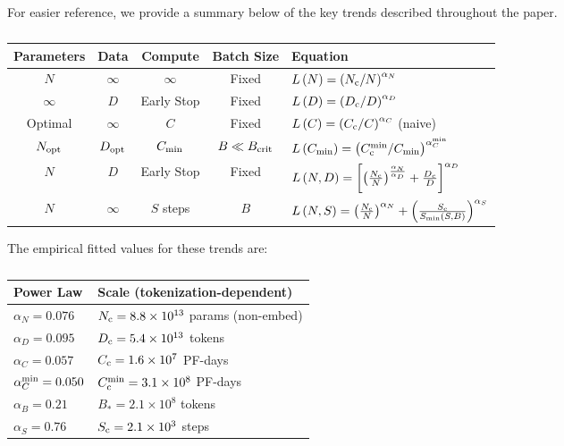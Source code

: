 \documentclass[english]{article}
\begin{document}
For easier reference, we provide a summary below of the key trends described throughout the paper.

\begin{table}[h!]
\centering
\vspace{-0.5em}
\begin{tabular}{|c|c|c|c|l|}
\hline 
\textbf{Parameters}  & \textbf{Data}  & \textbf{Compute}  & \textbf{Batch Size}  & \textbf{Equation}\tabularnewline
\hline 
\hline 
$N$  & $\infty$  & \multicolumn{1}{c|}{$\infty$ } & Fixed  & $L\left(N\right)=\left(N_{{\rm c}}/N\right)^{\alpha_{N}}$\tabularnewline
\hline 
$\infty$  & $D$  & \multicolumn{1}{c|}{Early Stop } & Fixed  & $L\left(D\right)=\left(D_{{\rm c}}/D\right)^{\alpha_{D}}$\tabularnewline
\hline 
Optimal  & $\infty$  & $C$  & Fixed  & $L\left(C\right)=\left(C_{{\rm c}}/C\right)^{\alpha_{C}}$ (naive)\tabularnewline
\hline 
$N_{{\rm opt}}$ & $D_{{\rm opt}}$ & $C_{{\rm min}}$  & $B\ll B_{{\rm crit}}$  & $L\left(C_{{\rm min}}\right)=\left(C_{{\rm c}}^{{\rm min}}/C_{{\rm min}}\right)^{\alpha_{C}^{{\rm min}}}$\tabularnewline
\hline 
$N$  & $D$  & \multicolumn{1}{c|}{Early Stop } & Fixed  & $L\left(N,D\right)=\left[\left(\frac{N_{{\rm c}}}{N}\right)^{\frac{\alpha_{N}}{\alpha_{D}}}+\frac{D_{c}}{D}\right]^{\alpha_{D}}$\tabularnewline
\hline 
$N$  & $\infty$  & $S$ steps & $B$  & $L\left(N,S\right)=\left(\frac{N_{{\rm c}}}{N}\right)^{\alpha_{N}}+\left(\frac{S_{{\rm c}}}{S_{{\rm min}}\left(S,B\right)}\right)^{\alpha_{S}}$\tabularnewline
\hline 
\end{tabular}
\vspace{0.5em}
\caption[Key trend equations]{}
\vspace{-1em}
\end{table}

The empirical fitted values for these trends are:


\begin{table}[h!]
\centering
\vspace{-0.5em}
\begin{tabular}{|l|l|}
\hline 
\textbf{Power Law}  & \textbf{Scale (tokenization-dependent)}\tabularnewline
\hline 
\hline 
$\alpha_{N}=0.076$  & $N_{{\rm c}}=8.8\times10^{13}$ params (non-embed)\tabularnewline
\hline 
$\alpha_{D}=0.095$  & $D_{{\rm c}}=5.4\times10^{13}$ tokens\tabularnewline
\hline 
$\alpha_{C}=0.057$  & $C_{{\rm c}}=1.6\times10^{7}$ PF-days\tabularnewline
\hline 
$\alpha_{C}^{{\rm min}}=0.050$  & $C_{{\rm c}}^{{\rm min}}=3.1\times10^{8}$ PF-days\tabularnewline
\hline 
$\alpha_{B}=0.21$  & $B_{\ast}=2.1\times10^{8}$ tokens\tabularnewline
\hline 
$\alpha_{S}=0.76$  & $S_{{\rm c}}=2.1\times10^{3}$ steps\tabularnewline
\hline 
\end{tabular}
\vspace{0.5em}
\caption[Key parameters to trend fits]{}
\vspace{-1em}
\end{table}
\end{document}
